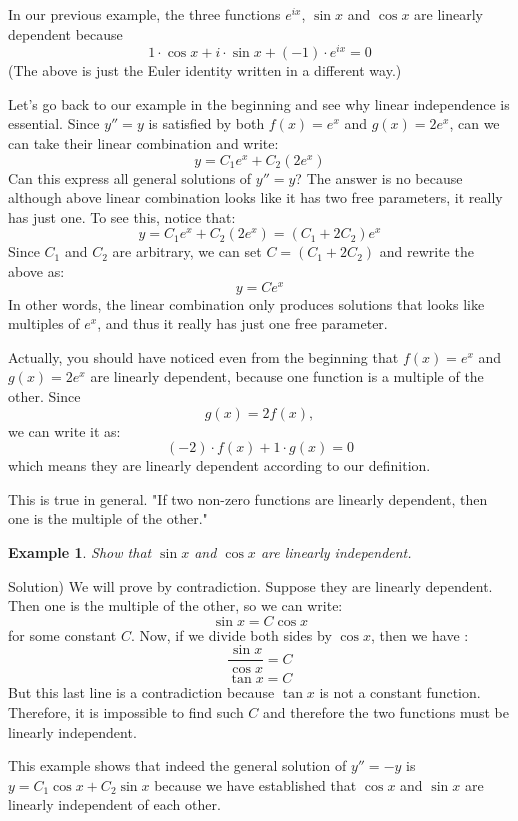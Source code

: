 \documentclass[12pt]{report}
\newtheorem{ex}{Example}[section]
\begin{document}
In our previous example, the three functions $e^{ix}$, $\sin x$ and $\cos x$ are linearly dependent because
$$ 1\cdot \cos x + i\cdot \sin x + (-1)\cdot e^{ix} =0 $$
(The above is just the Euler identity written in a different way.)

Let's go back to our example in the beginning and see why linear independence is essential. Since $y''=y$ is satisfied by both $f(x)=e^x$ and $g(x)=2e^x$, can we can take their linear combination and write:
$$y = C_1 e^x + C_2 (2e^x)$$
Can this express all general solutions of $y''=y$? The answer is no because although above linear combination looks like it has two free parameters, it really has just one. To see this, notice that:
$$y = C_1 e^x + C_2 (2e^x) = (C_1 + 2C_2 )e^x$$
Since $C_1$ and $C_2$ are arbitrary, we can set $C=(C_1 + 2C_2 )$ and rewrite the above as:
$$y = C e^x$$
In other words, the linear combination only produces solutions that looks like multiples of $e^x$, and thus it really has just one free parameter.

Actually, you should have noticed even from the beginning that $f(x)=e^x$ and $g(x)=2e^x$ are linearly dependent, because one function is a multiple of the other. Since
$$g(x)=2f(x),$$
we can write it as:
$$(-2)\cdot f(x)+1\cdot g(x)=0$$
which means they are linearly dependent according to our definition.

This is true in general. "If two non-zero functions are linearly dependent, then one is the multiple of the other."

\begin{ex}
Show that $\sin x$ and $\cos x$ are linearly independent.
\end{ex}
Solution)
We will prove by contradiction. Suppose they are linearly dependent. Then one is the multiple of the other, so we can write:
$$\sin x = C \cos x$$
for some constant $C$. Now, if we divide both sides by $\cos x$, then we have :
$$\frac{\sin x}{\cos x} = C$$
$$\tan x =C $$
But this last line is a contradiction because $\tan x$ is not a constant function. Therefore, it is impossible to find such $C$ and therefore the two functions must be linearly independent.

This example shows that indeed the general solution of $y''=-y$ is $y = C_1 \cos x + C_2 \sin x$ because we have established that $\cos x$ and $\sin x$ are linearly independent of each other.
\end{document}
